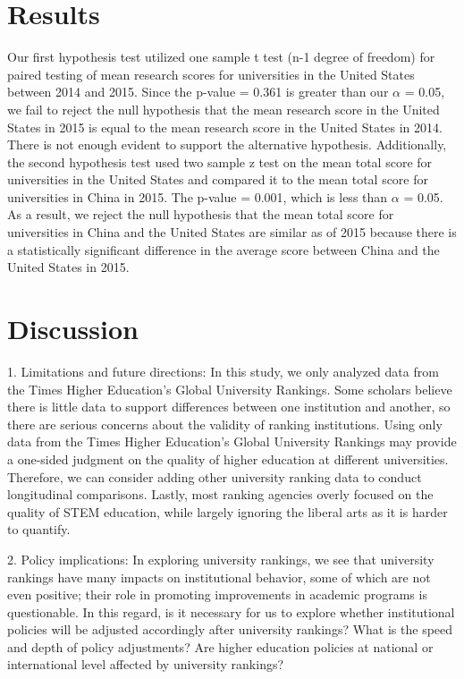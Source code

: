 \documentclass[a4paper]{article}
\begin{document}
\section* {Results}
Our first hypothesis test utilized one sample t test (n-1 degree of freedom) for paired testing of mean research scores for universities in the United States between 2014 and 2015. Since the p-value = 0.361 is greater than our $\alpha$ = 0.05, we fail to reject the null hypothesis that the mean research score in the United States in 2015 is equal to the mean research score in the United States in 2014. There is not enough evident to support the alternative hypothesis. \newline Additionally, the second hypothesis test used two sample z test on the mean total score for universities in the  United States and compared it to the mean total score for universities in China in 2015. The p-value = 0.001, which is less than $\alpha$ = 0.05. As a result, we reject the null hypothesis that the mean total score for universities in China and the United States are similar as of 2015 because there is a statistically significant difference in the average score between China and the United States in 2015.

\section*{Discussion}
1. Limitations and future directions: In this study, we only analyzed data from the Times Higher Education's Global University Rankings. Some scholars believe there is little data to support differences between one institution and another, so there are serious concerns about the validity of ranking institutions\cite{davis_2016}. Using only data from the Times Higher Education's Global University Rankings may provide a one-sided judgment on the quality of higher education at different universities. Therefore, we can consider adding other university ranking data to conduct longitudinal comparisons. Lastly, most ranking agencies overly focused on the quality of STEM education, while largely ignoring the liberal arts as it is harder to quantify.

2. Policy implications: In exploring university rankings, we see that university rankings have many impacts on institutional behavior, some of which are not even positive; their role in promoting improvements in academic programs is questionable. In this regard, is it necessary for us to explore whether institutional policies will be adjusted accordingly after university rankings? What is the speed and depth of policy adjustments? Are higher education policies at national or international level affected by university rankings?
\end{document}
